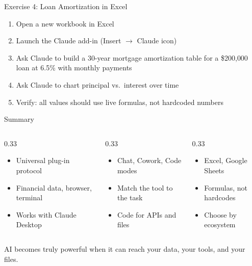 \documentclass[aspectratio=169]{beamer}
\begin{document}
\begin{frame}{Exercise 4: Loan Amortization in Excel}
\begin{enumerate}
  \item Open a new workbook in Excel
  \item Launch the Claude add-in (Insert $\rightarrow$ Claude icon)
  \item Ask Claude to build a 30-year mortgage amortization table for a \$200{,}000 loan at 6.5\% with monthly payments
  \item Ask Claude to chart principal vs.\ interest over time
  \item Verify: \alert{all values should use live formulas, not hardcoded numbers}
\end{enumerate}
\end{frame}

\begin{frame}{Summary}
\begin{columns}[T]
\begin{column}{0.33\textwidth}
\begin{shadedbox}[title=\textbf{MCP}]
\begin{itemize}\small
  \item Universal plug-in protocol
  \item Financial data, browser, terminal
  \item Works with Claude Desktop
\end{itemize}
\end{shadedbox}
\end{column}
\begin{column}{0.33\textwidth}
\begin{shadedbox}[title=\textbf{Code Execution}]
\begin{itemize}\small
  \item Chat, Cowork, Code modes
  \item Match the tool to the task
  \item Code for APIs and files
\end{itemize}
\end{shadedbox}
\end{column}
\begin{column}{0.33\textwidth}
\begin{shadedbox}[title=\textbf{AI in Apps}]
\begin{itemize}\small
  \item Excel, Google Sheets
  \item Formulas, not hardcodes
  \item Choose by ecosystem
\end{itemize}
\end{shadedbox}
\end{column}
\end{columns}
\vspace{0.5cm}
\begin{center}
\alert{AI becomes truly powerful when it can reach your data, your tools, and your files.}
\end{center}
\end{frame}
\end{document}
